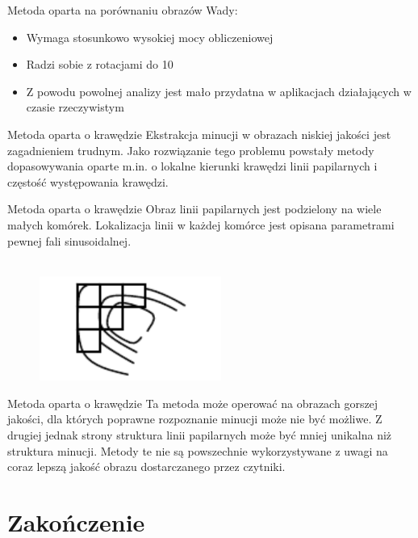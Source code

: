 \documentclass{beamer}
\begin{document}
\begin{frame}{Metoda oparta na porównaniu obrazów}
    Wady:
    \begin{itemize}
        \item Wymaga stosunkowo wysokiej mocy obliczeniowej
        \item Radzi sobie z rotacjami do 10\degree
        \item Z powodu powolnej analizy jest mało przydatna w aplikacjach działających w czasie rzeczywistym
    \end{itemize}
\end{frame}

\begin{frame}{Metoda oparta o krawędzie}
    Ekstrakcja minucji w obrazach niskiej jakości jest zagadnieniem trudnym. Jako rozwiązanie tego problemu powstały metody dopasowywania oparte m.in. o lokalne kierunki krawędzi linii papilarnych i częstość występowania krawędzi.
\end{frame}

\begin{frame}{Metoda oparta o krawędzie}
    Obraz linii papilarnych jest podzielony na wiele małych komórek. Lokalizacja linii w każdej komórce jest opisana parametrami pewnej fali sinusoidalnej. \\~\
    \begin{figure}[t]
        \centering
        \includegraphics[width=0.53\textwidth]{algorithms/krawedzie.png}
    \end{figure}
\end{frame}

\begin{frame}{Metoda oparta o krawędzie}
    Ta metoda może operować na obrazach gorszej jakości, dla których poprawne rozpoznanie minucji może nie być możliwe. Z drugiej jednak strony struktura linii papilarnych może być mniej unikalna niż struktura minucji. Metody te nie są powszechnie wykorzystywane z uwagi na coraz lepszą jakość obrazu dostarczanego przez czytniki.
\end{frame}

\section{Zakończenie}
\end{document}
